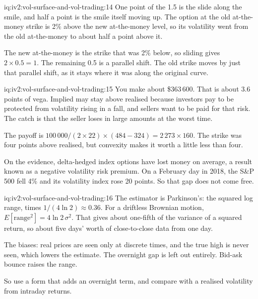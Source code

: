 \begin{solution}{iq:iv2:vol-surface-and-vol-trading:14}
One point of the 1.5 is the slide along the smile, and half a point is the smile itself moving up. The option at the old at-the-money strike is 2\% above the new at-the-money level, so its volatility went from the old at-the-money to about half a point above it.

The new at-the-money is the strike that was 2\% below, so sliding gives $2 \times 0.5 = 1$. The remaining 0.5 is a parallel shift. The old strike moves by just that parallel shift, as it stays where it was along the original curve.

\end{solution}

\begin{solution}{iq:iv2:vol-surface-and-vol-trading:15}
You make about \$363\,600. That is about 3.6 points of vega. Implied may stay above realised because investors pay to be protected from volatility rising in a fall, and sellers want to be paid for that risk. The catch is that the seller loses in large amounts at the worst time.

The payoff is $100\,000/(2 \times 22) \times (484 - 324) = 2\,273 \times 160$. The strike was four points above realised, but convexity makes it worth a little less than four.

On the evidence, delta-hedged index options have lost money on average, a result known as a negative volatility risk premium. On a February day in 2018, the S\&P 500 fell 4\% and its volatility index rose 20 points. So that gap does not come free.

\end{solution}

\begin{solution}{iq:iv2:vol-surface-and-vol-trading:16}
The estimator is Parkinson's: the squared log range, times $1/(4\ln 2) \approx 0.36$. For a driftless Brownian motion, $E[\text{range}^2] = 4\ln 2\,\sigma^2$. That gives about one-fifth of the variance of a squared return, so about five days' worth of close-to-close data from one day.

The biases: real prices are seen only at discrete times, and the true high is never seen, which lowers the estimate. The overnight gap is left out entirely. Bid-ask bounce raises the range.

So use a form that adds an overnight term, and compare with a realised volatility from intraday returns.

\end{solution}

